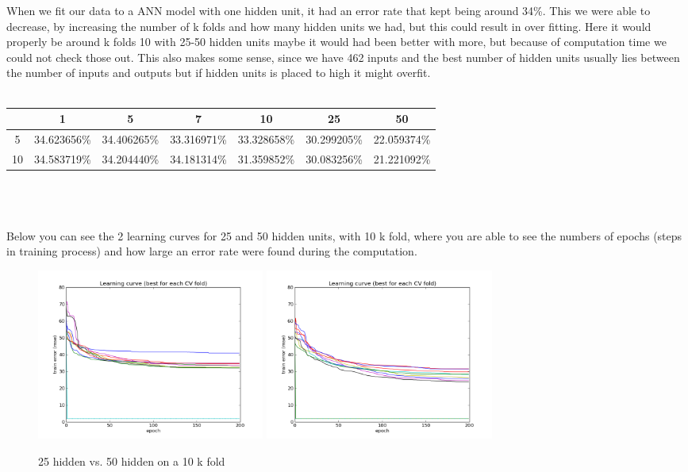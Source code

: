 \documentclass{article}
\begin{document}
When we fit our data to a ANN model with one hidden unit, it had an error rate that kept being around 34\%. This we were able to decrease, by increasing the number of k folds and how many hidden units we had, but this could result in over fitting. Here it would properly be around k folds 10 with 25-50 hidden units maybe it would had been better with more, but because of computation time we could not check those out. This also makes some sense, since we have 462 inputs and the best number of hidden units usually lies between the number of inputs and outputs but if hidden units is placed to high it might overfit.
\\\\
\begin{tabular}{|c|c|c|c|c|c|c|}
\hline 
   & 1 			 & 5 		   & 7 			 & 10		   & 25			 & 50 \\ \hline 
5  & 34.623656\% & 34.406265\% & 33.316971\% & 33.328658\% & 30.299205\% & 22.059374\% \\ \hline 
10 & 34.583719\% & 34.204440\% & 34.181314\% & 31.359852\% & 30.083256\% & 21.221092\% \\ \hline 
\end{tabular}
\\\\\\
Below you can see the 2 learning curves for 25 and 50 hidden units, with 10 k fold, where you are able to see the numbers of epochs (steps in training process) and how large an error rate were found during the computation.
\begin{figure}[!h]
\centering
\includegraphics[width=7.5cm, keepaspectratio=true]{pictures/ann_1_10_25.png}
\includegraphics[width=7.5cm, keepaspectratio=true]{pictures/ann_1_10_50.png}
\vspace{-0.4cm}
\caption{\footnotesize 25 hidden vs. 50 hidden on a 10 k fold}
\label{full_10_25_50}
\end{figure}
\end{document}
